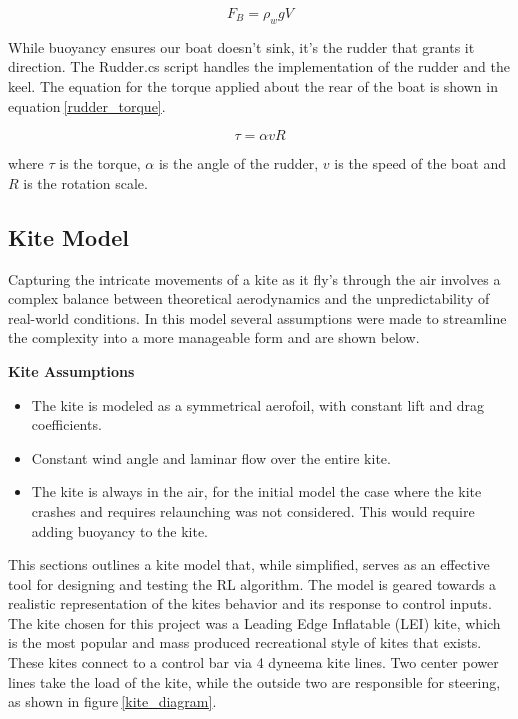 \begin{equation}
    F_B = \rho_{w}gV
    \label{archimedes}
\end{equation}

While buoyancy ensures our boat doesn't sink, it's the rudder that grants it direction. The Rudder.cs script handles the implementation of the rudder and the keel. The equation for the torque applied about the rear of the boat is shown in equation$~$\ref{rudder_torque}. 

\begin{equation}
    \tau = \alpha v R
    \label{rudder_torque}
\end{equation}

where $\tau$ is the torque, $\alpha$ is the angle of the rudder, $v$ is the speed of the boat and $R$ is the rotation scale.

\subsection{Kite Model}\label{sec:Kite}
Capturing the intricate movements of a kite as it fly's through the air involves a complex balance between theoretical aerodynamics and the unpredictability of real-world conditions. In this model several assumptions were made to streamline the complexity into a more manageable form and are shown below.

\textbf{Kite Assumptions}
\begin{itemize}
    \item The kite is modeled as a symmetrical aerofoil, with constant lift and drag coefficients.
    \item Constant wind angle and laminar flow over the entire kite.
    \item The kite is always in the air, for the initial model the case where the kite crashes and requires relaunching was not considered. This would require adding buoyancy to the kite.
\end{itemize}

This sections outlines a kite model that, while simplified, serves as an effective tool for designing and testing the RL algorithm. The model is geared towards a realistic representation of the kites behavior and its response to control inputs. The kite chosen for this project was a Leading Edge Inflatable (LEI) kite, which is the most popular and mass produced recreational style of kites that exists. These kites connect to a control bar via 4 dyneema kite lines. Two center power lines take the load of the kite, while the outside two are responsible for steering, as shown in figure$~$\ref{kite_diagram}.

